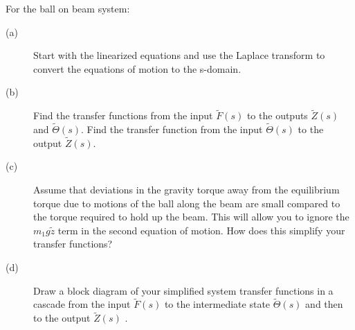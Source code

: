  For the ball on beam system:
  \begin{description}
    \item[(a)] Start with the linearized equations and use the Laplace transform to convert the equations of motion to the s-domain. 
    \item[(b)] Find the transfer functions from the input $\tilde{F}(s)$ to the outputs $\tilde{Z}(s)$ and $\tilde{\Theta}(s)$. Find the transfer function from the input $\tilde{\Theta}(s)$ to the output $\tilde{Z}(s)$.
    \item[(c)] Assume that deviations in the gravity torque away from the equilibrium torque due to motions of the ball along the beam are small compared to the torque required to hold up the beam. This will allow you to ignore the $m_1 g \tilde{z}$ term in the second equation of motion. How does this simplify your transfer functions? 
    \item[(d)] Draw a block diagram of your simplified system transfer functions in a cascade from the input $\tilde{F}(s)$ to the intermediate state $\tilde{\Theta}(s)$ and then to the output $\tilde{Z}(s)$ .
  \end{description}
